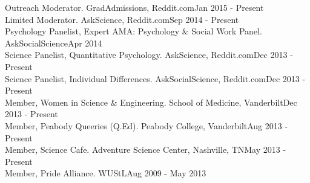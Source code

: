 \documentclass {resume}
\begin{document}
\begin{rSection}{\textrm{Outreach}}
Moderator. GradAdmissions, Reddit.com\hfill  {Jan 2015 - Present}\smallskip\\
Limited Moderator. AskScience, Reddit.com\hfill  {Sep 2014 - Present}\smallskip\\
Psychology Panelist, Expert AMA: Psychology \& Social Work Panel. AskSocialScience\hfill  {Apr 2014}\smallskip\\
Science Panelist, Quantitative Psychology. AskScience, Reddit.com\hfill  {Dec 2013 - Present}\smallskip\\%
Science Panelist, Individual Differences. AskSocialScience, Reddit.com\hfill  {Dec 2013 - Present}\smallskip\\
Member, Women in Science \& Engineering. School of Medicine, Vanderbilt\hfill  {Dec 2013 - Present}\smallskip\\%
Member, Peabody Queeries (Q.Ed). Peabody College, Vanderbilt\hfill  {Aug 2013 - Present}\smallskip\\
Member, Science Cafe. Adventure Science Center, Nashville, TN\hfill  {May 2013 - Present}\smallskip\\
Member, Pride Alliance. WUStL\hfill  {Aug 2009 - May 2013}
\end{rSection}
\end{document}
